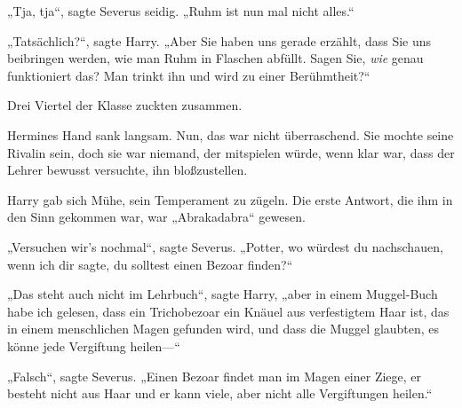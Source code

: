 „Tja, tja“, sagte Severus seidig. „Ruhm ist nun mal nicht alles.“

„Tatsächlich?“, sagte Harry. „Aber Sie haben uns gerade erzählt, dass Sie uns beibringen werden, wie man Ruhm in Flaschen abfüllt. Sagen Sie, \emph{wie} genau funktioniert das? Man trinkt ihn und wird zu einer Berühmtheit?“

Drei Viertel der Klasse zuckten zusammen.

Hermines Hand sank langsam. Nun, das war nicht überraschend. Sie mochte seine Rivalin sein, doch sie war niemand, der mitspielen würde, wenn klar war, dass der Lehrer bewusst versuchte, ihn bloßzustellen.

Harry gab sich Mühe, sein Temperament zu zügeln. Die erste Antwort, die ihm in den Sinn gekommen war, war „Abrakadabra“ gewesen.

„Versuchen wir’s nochmal“, sagte Severus. „Potter, wo würdest du nachschauen, wenn ich dir sagte, du solltest einen Bezoar finden?“

„Das steht auch nicht im Lehrbuch“, sagte Harry, „aber in einem Muggel-Buch habe ich gelesen, dass ein Trichobezoar ein Knäuel aus verfestigtem Haar ist, das in einem menschlichen Magen gefunden wird, und dass die Muggel glaubten, es könne jede Vergiftung heilen—“%

„Falsch“, sagte Severus. „Einen Bezoar findet man im Magen einer Ziege, er besteht nicht aus Haar und er kann viele, aber nicht alle Vergiftungen heilen.“

